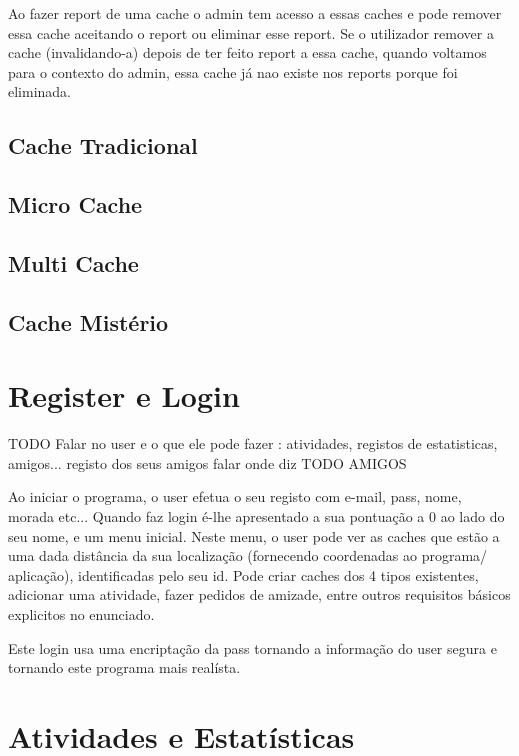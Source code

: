 \documentclass{article}
\begin{document}
Ao fazer report de uma cache o admin tem acesso a essas caches e pode remover essa cache aceitando o report ou eliminar esse report. Se o utilizador remover a cache (invalidando-a) depois de ter feito report a essa cache, quando voltamos para o contexto do admin, essa cache já nao existe nos reports porque foi eliminada.

\subsection{ Cache Tradicional}
\subsection{ Micro Cache }
\subsection{ Multi Cache}
\subsection{ Cache Mistério }



\pagebreak
\section{Register e Login}
TODO
Falar no user e o que ele pode fazer : atividades, registos de estatisticas, amigos...
registo dos seus amigos falar onde diz TODO AMIGOS

Ao iniciar o programa, o user efetua o seu registo com e-mail, pass, nome, morada etc... Quando faz login é-lhe apresentado a sua pontuação a 0 ao lado do seu nome, e um menu inicial.
Neste menu, o user pode ver as caches que estão a uma dada distância da sua localização (fornecendo coordenadas ao programa/ aplicação), identificadas pelo seu id. Pode criar caches dos 4 tipos existentes, adicionar uma atividade, fazer pedidos de amizade, entre outros requisitos básicos explicitos no enunciado.

Este login usa uma encriptação da pass tornando a informação do user segura e tornando este programa mais realísta.








\pagebreak
\section{Atividades e Estatísticas}
\end{document}
